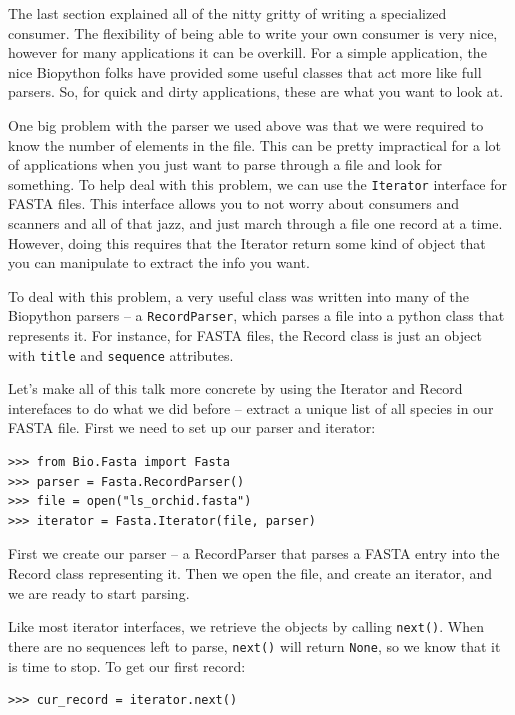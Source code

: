\documentclass{article}
\begin{document}
The last section explained all of the nitty gritty of writing a specialized consumer. The flexibility of being able to write your own consumer is very nice, however for many applications it can be overkill. For a simple application, the nice Biopython folks have provided some useful classes that act more like full parsers. So, for quick and dirty applications, these are what you want to look at. 


One big problem with the parser we used above was that we were required to know the number of elements in the file. This can be pretty impractical for a lot of applications when you just want to parse through a file and look for something. To help deal with this problem, we can use the \verb|Iterator| interface for FASTA files. This interface allows you to not worry about consumers and scanners and all of that jazz, and just march through a file one record at a time. However, doing this requires that the Iterator return some kind of object that you can manipulate to extract the info you want.


To deal with this problem, a very useful class was written into many of the Biopython parsers -- a \verb|RecordParser|, which parses a file into a python class that represents it. For instance, for FASTA files, the Record class is just an object with \verb|title| and \verb|sequence| attributes. 


Let's make all of this talk more concrete by using the Iterator and Record interefaces to do what we did before -- extract a unique list of all species in our FASTA file. First we need to set up our parser and iterator:

\begin{verbatim}
>>> from Bio.Fasta import Fasta
>>> parser = Fasta.RecordParser()
>>> file = open("ls_orchid.fasta")
>>> iterator = Fasta.Iterator(file, parser)
\end{verbatim}

First we create our parser -- a RecordParser that parses a FASTA entry into the Record class representing it. Then we open the file, and create an iterator, and we are ready to start parsing.


Like most iterator interfaces, we retrieve the objects by calling \verb|next()|. When there are no sequences left to parse, \verb|next()| will return \verb|None|, so we know that it is time to stop. To get our first record:

\begin{verbatim}
>>> cur_record = iterator.next()
\end{verbatim}
\end{document}
